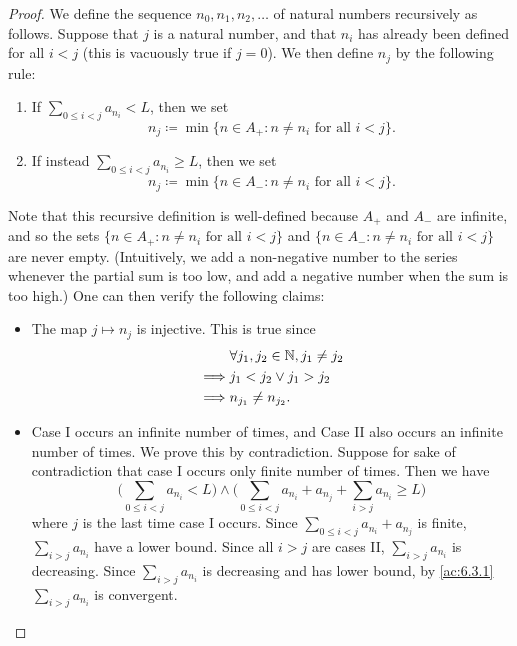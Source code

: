 \begin{proof}
  We define the sequence \(n_0, n_1, n_2, \dots\) of natural numbers recursively as follows.
  Suppose that \(j\) is a natural number, and that \(n_i\) has already been defined for all \(i < j\) (this is vacuously true if \(j = 0\)).
  We then define \(n_j\) by the following rule:
  \begin{enumerate}[label=(\Roman*)]
    \item If \(\sum_{0 \leq i < j} a_{n_i} < L\), then we set
          \[
            n_j \coloneqq \min\{n \in A_+ : n \neq n_i \text{ for all } i < j\}.
          \]
    \item If instead \(\sum_{0 \leq i < j} a_{n_i} \geq L\), then we set
          \[
            n_j \coloneqq \min\{n \in A_- : n \neq n_i \text{ for all } i < j\}.
          \]
  \end{enumerate}
  Note that this recursive definition is well-defined because \(A_+\) and \(A_-\) are infinite, and so the sets \(\{n \in A_+ : n \neq n_i \text{ for all } i < j\}\) and \(\{n \in A_- : n \neq n_i \text{ for all } i < j\}\) are never empty.
  (Intuitively, we add a non-negative number to the series whenever the partial sum is too low, and add a negative number when the sum is too high.)
  One can then verify the following claims:
  \begin{itemize}
    \item The map \(j \mapsto n_j\) is injective.
          This is true since
          \begin{align*}
                     & \forall j_1, j_2 \in \mathbb{N}, j_1 \neq j_2 \\
            \implies & j_1 < j_2 \lor j_1 > j_2              \\
            \implies & n_{j_1} \neq n_{j_2}.
          \end{align*}
    \item Case I occurs an infinite number of times, and Case II also occurs an infinite number of times.
          We prove this by contradiction.
          Suppose for sake of contradiction that case I occurs only finite number of times.
          Then we have
          \[
            \Bigg(\sum_{0 \leq i < j} a_{n_i} < L\Bigg) \land \Bigg(\sum_{0 \leq i < j} a_{n_i} + a_{n_j} + \sum_{i > j} a_{n_i} \geq L\Bigg)
          \]
          where \(j\) is the last time case I occurs.
          Since \(\sum_{0 \leq i < j} a_{n_i} + a_{n_j}\) is finite, \(\sum_{i > j} a_{n_i}\) have a lower bound.
          Since all \(i > j\) are cases II, \(\sum_{i > j} a_{n_i}\) is decreasing.
          Since \(\sum_{i > j} a_{n_i}\) is decreasing and has lower bound, by \cref{ac:6.3.1} \(\sum_{i > j} a_{n_i}\) is convergent.

\end{itemize}
\end{proof}
